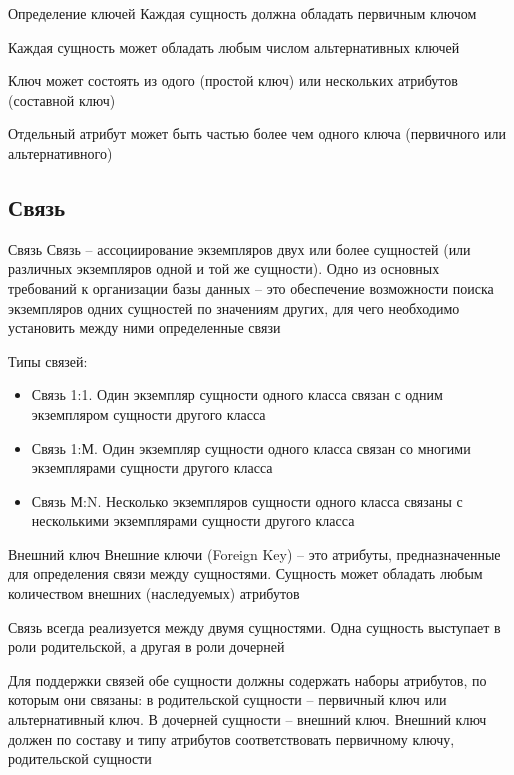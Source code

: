 \documentclass[12pt]{article}
\begin{document}
\begin{Remark}{Определение ключей}
    Каждая сущность должна обладать первичным ключом 

    Каждая сущность может обладать любым числом альтернативных ключей 

    Ключ может состоять из одого (простой ключ) или нескольких атрибутов (составной ключ)

    Отдельный атрибут может быть частью более чем одного ключа (первичного или альтернативного)
\end{Remark}

\newpage 

\subsection{Связь}

\begin{defin}{Связь}
    Связь -- ассоциирование экземпляров двух или более сущностей (или различных экземпляров одной и той же сущности). Одно из основных требований к организации базы данных -- это обеспечение возможности поиска экземпляров одних сущностей по значениям других, для чего необходимо установить между ними определенные связи 

    Типы связей:

    \begin{itemize}
        \item Связь 1:1. Один экземпляр сущности одного класса связан с одним экземпляром сущности другого класса
        \item Связь 1:М. Один экземпляр сущности одного класса связан со многими экземплярами сущности другого класса
        \item Связь М:N. Несколько экземпляров сущности одного класса связаны с несколькими экземплярами сущности другого класса
    \end{itemize}
\end{defin}

\begin{defin}{Внешний ключ}
    Внешние ключи (Foreign Key) -- это атрибуты, предназначенные для определения связи между сущностями. Сущность может обладать любым количеством внешних (наследуемых) атрибутов 

    Связь всегда реализуется между двумя сущностями. Одна сущность выступает в роли родительской, а другая в роли дочерней 

    Для поддержки связей обе сущности должны содержать наборы атрибутов, по которым они связаны: в родительской сущности -- первичный ключ или альтернативный ключ. В дочерней сущности -- внешний ключ. Внешний ключ должен по составу и типу атрибутов соответствовать первичному ключу, родительской сущности 
\end{defin}
\end{document}
